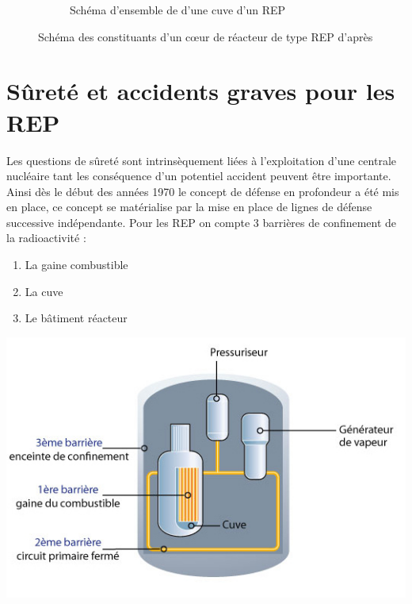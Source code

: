 \documentclass[a4paper,11pt,fleqn]{report}    %
\begin{document}
\begin{figure}[H]
\begin{subfigure}[t]{0.45\textwidth}
     	\caption{Schéma d'ensemble de d'une cuve d'un REP}
     	\label{subfig:example-image-c}
    	 \end{subfigure}
	     \caption{Schéma des constituants d'un c\oe ur de réacteur de type REP d'après \cite{ clement_les_2020} }
	     \label{fig:test_subfigure}
	\end{figure}
\section{Sûreté et accidents graves pour les REP}
Les questions de sûreté sont intrinsèquement liées à l'exploitation d'une centrale nucléaire tant les conséquence d'un potentiel accident peuvent être importante. Ainsi dès le début des années 1970 le concept de défense en profondeur a été mis en place, ce concept se matérialise par la mise en place de lignes de défense successive indépendante. Pour les REP on compte 3 barrières de confinement de la radioactivité :
 \\
\begin{minipage}[c]{0.3\linewidth}
	\begin{enumerate}
		\item La gaine combustible
		\item La cuve
		\item Le bâtiment réacteur
	\end{enumerate}
\end{minipage} \hfill
\begin{minipage}[c]{0.65\linewidth}
	\centering
	\includegraphics[width=0.7\linewidth]{figure/irsn_barriere-confinement.png}
\end{minipage}
\vspace{0.5cm}
\end{document}
